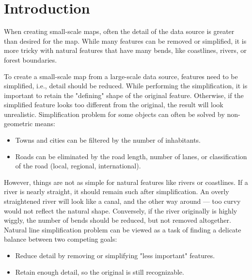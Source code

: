 \documentclass[a4paper]{article}
\begin{document}
\newpage

\section{Introduction}
\label{sec:introduction}

When creating small-scale maps, often the detail of the data source is greater
than desired for the map. While many features can be removed or simplified, it
is more tricky with natural features that have many bends, like coastlines,
rivers, or forest boundaries.

To create a small-scale map from a large-scale data source, features need to be
simplified, i.e., detail should be reduced. While performing the
simplification, it is important to retain the "defining" shape of the original
feature. Otherwise, if the simplified feature looks too different from the
original, the result will look unrealistic. Simplification problem for some
objects can often be solved by non-geometric means:

\begin{itemize}
    \item Towns and cities can be filtered by the number of inhabitants.
    \item Roads can be eliminated by the road length, number of lanes, or
        classification of the road (local, regional, international).
\end{itemize}

However, things are not as simple for natural features like rivers or
coastlines. If a river is nearly straight, it should remain such after
simplification. An overly straightened river will look like a canal, and the
other way around --- too curvy would not reflect the natural shape. Conversely,
if the river originally is highly wiggly, the number of bends should be
reduced, but not removed altogether. Natural line simplification problem can be
viewed as a task of finding a delicate balance between two competing goals:

\begin{itemize}
    \item Reduce detail by removing or simplifying "less important" features.
    \item Retain enough detail, so the original is still recognizable.
\end{itemize}
\end{document}
